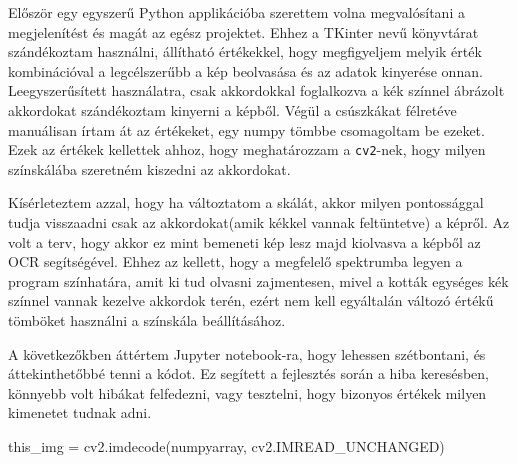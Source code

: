 




Először egy egyszerű Python applikációba szerettem volna megvalósítani a megjelenítést és magát az egész projektet. Ehhez a TKinter nevű könyvtárat szándékoztam használni, állítható értékekkel, hogy megfigyeljem melyik érték kombinációval a legcélszerűbb a kép beolvasása és az adatok kinyerése onnan. Leegyszerűsített használatra, csak akkordokkal foglalkozva a kék színnel ábrázolt akkordokat szándékoztam kinyerni a képből. Végül a csúszkákat félretéve manuálisan írtam át az értékeket, egy numpy tömbbe csomagoltam be ezeket. Ezek az értékek kellettek ahhoz, hogy meghatározzam a \texttt{cv2}-nek, hogy milyen színskálába szeretném kiszedni az akkordokat. 

Kísérleteztem azzal, hogy ha változtatom a skálát, akkor milyen pontossággal tudja visszaadni csak az akkordokat(amik kékkel vannak feltüntetve) a képről. Az volt a terv, hogy akkor ez mint bemeneti kép lesz majd kiolvasva a képből az OCR segítségével. Ehhez az kellett, hogy a megfelelő spektrumba legyen a program színhatára, amit ki tud olvasni zajmentesen, mivel a kották egységes kék színnel vannak kezelve akkordok terén, ezért nem kell egyáltalán változó értékű tömböket használni a színskála beállításához.


A következőkben áttértem Jupyter notebook-ra, hogy lehessen szétbontani, és áttekinthetőbbé tenni a kódot. Ez segített a fejlesztés során a hiba keresésben, könnyebb volt hibákat felfedezni, vagy tesztelni, hogy bizonyos értékek milyen kimenetet tudnak adni.
\begin{python}
this_img = cv2.imdecode(numpyarray, cv2.IMREAD_UNCHANGED)	
\end{python}


